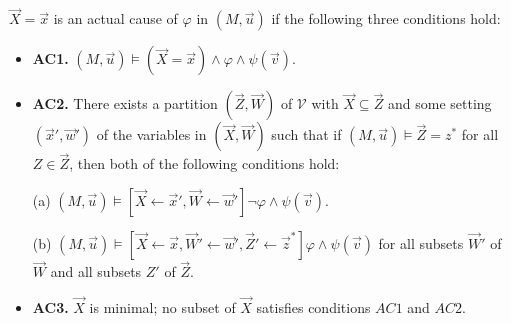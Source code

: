 \begin{definition}
    $\vec X = \vec x$ is an actual cause of $\varphi$ in $(M,\vec u)$ if the following three conditions hold:
    \begin{itemize}
        \item  \textbf{AC1.} $(M,\vec u)\models (\vec X = \vec x) \wedge \varphi \wedge \psi(\vec v)$.
        \item  \textbf{AC2. }There exists a partition $(\vec Z, \vec W)$ of $\mathcal{V}$ with $\vec X \subseteq \vec Z$ and some setting $(\vec x',\vec w')$ of the variables in $(\vec X,\vec W)$ such that if $(M,\vec u)\models \vec Z = z^*$ for all $Z\in \vec Z$, then both of the following conditions hold:

              (a) $(M,\vec u)\models[\vec X \leftarrow \vec x', \vec W \leftarrow \vec w']\neg \varphi \wedge \psi(\vec v)$.

              (b) $(M,\vec u)\models[\vec X\leftarrow \vec x, \vec W' \leftarrow \vec w', \vec Z'\leftarrow \vec z^*]\varphi \wedge \psi(\vec v)$ for all subsets $\vec W'$ of $\vec W$ and all subsets $Z'$ of $\vec Z$.

        \item  \textbf{AC3.} $\vec X$ is minimal; no subset of $\vec X$ satisfies conditions $AC1$ and $AC2$.
    \end{itemize}
\end{definition}
